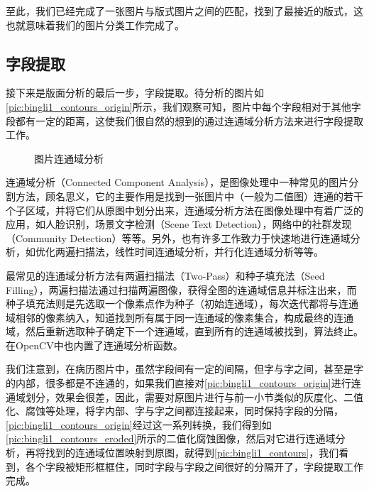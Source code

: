 至此，我们已经完成了一张图片与版式图片之间的匹配，找到了最接近的版式，这也就意味着我们的图片分类工作完成了。

\subsection{字段提取}
接下来是版面分析的最后一步，字段提取。待分析的图片如\autoref{pic:bingli1_contours_origin}所示，我们观察可知，图片中每个字段相对于其他字段都有一定的距离，这使我们很自然的想到的通过连通域分析方法来进行字段提取工作。
\begin{figure}[htbp]
  \centering
  \caption{图片连通域分析}
  \label{pic:connected-component-analysis}
\end{figure}
连通域分析（Connected Component Analysis），是图像处理中一种常见的图片分割方法，顾名思义，它的主要作用是找到一张图片中（一般为二值图）连通的若干个子区域，并将它们从原图中划分出来，连通域分析方法在图像处理中有着广泛的应用，如人脸识别\citep{kuchi2002human}，场景文字检测（Scene Text Detection）\citep{koo2013scene}，网络中的社群发现（Community Detection）\citep{duch2005community}等等。另外，也有许多工作致力于快速地进行连通域分析，如优化两遍扫描法\citep{wu2009optimizing}，线性时间连通域分析\citep{suzuki2003linear}，并行化连通域分析\citep{han1990efficient}等等。

最常见的连通域分析方法有两遍扫描法（Two-Pass）和种子填充法（Seed Filling），两遍扫描法通过扫描两遍图像，获得全图的连通域信息并标注出来，而种子填充法则是先选取一个像素点作为种子（初始连通域），每次迭代都将与连通域相邻的像素纳入，知道找到所有属于同一连通域的像素集合，构成最终的连通域，然后重新选取种子确定下一个连通域，直到所有的连通域被找到，算法终止。在OpenCV中也内置了连通域分析函数。

我们注意到，在病历图片中，虽然字段间有一定的间隔，但字与字之间，甚至是字的内部，很多都是不连通的，如果我们直接对\autoref{pic:bingli1_contours_origin}进行连通域划分，效果会很差，因此，需要对原图片进行与前一小节类似的灰度化、二值化、腐蚀等处理，将字内部、字与字之间都连接起来，同时保持字段的分隔，\autoref{pic:bingli1_contours_origin}经过这一系列转换，我们得到如\autoref{pic:bingli1_contours_eroded}所示的二值化腐蚀图像，然后对它进行连通域分析，再将找到的连通域位置映射到原图，就得到\autoref{pic:bingli1_contours}，我们看到，各个字段被矩形框框住，同时字段与字段之间很好的分隔开了，字段提取工作完成。

